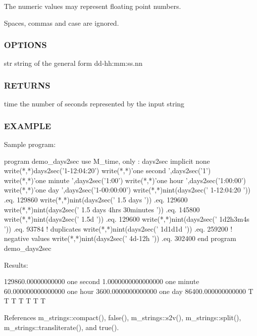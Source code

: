 The numeric values may represent floating point numbers.

Spaces, commas and case are ignored.

\subsubsection*{O\+P\+T\+I\+O\+NS}

str string of the general form dd-\/hh\+:mm\+:ss.\+nn \subsubsection*{R\+E\+T\+U\+R\+NS}

time the number of seconds represented by the input string

\subsubsection*{E\+X\+A\+M\+P\+LE}

\begin{DoxyVerb}Sample program:

 program demo_days2sec
 use M_time, only : days2sec
 implicit none
    write(*,*)days2sec('1-12:04:20')
    write(*,*)'one second ',days2sec('1')
    write(*,*)'one minute ',days2sec('1:00')
    write(*,*)'one hour ',days2sec('1:00:00')
    write(*,*)'one day ',days2sec('1-00:00:00')
    write(*,*)nint(days2sec(' 1-12:04:20              ')) .eq. 129860
    write(*,*)nint(days2sec(' 1.5 days                ')) .eq. 129600
    write(*,*)nint(days2sec(' 1.5 days 4hrs 30minutes ')) .eq. 145800
    write(*,*)nint(days2sec(' 1.5d                    ')) .eq. 129600
    write(*,*)nint(days2sec(' 1d2h3m4s                ')) .eq. 93784
    ! duplicates
    write(*,*)nint(days2sec(' 1d1d1d                  ')) .eq. 259200
    ! negative values
    write(*,*)nint(days2sec(' 4d-12h                  ')) .eq. 302400
 end program demo_days2sec

Results:

 129860.00000000000
 one second    1.0000000000000000
 one minute    60.000000000000000
 one hour    3600.0000000000000
 one day    86400.000000000000
 T
 T
 T
 T
 T
 T
 T \end{DoxyVerb}
 

References m\+\_\+strings\+::compact(), false(), m\+\_\+strings\+::s2v(), m\+\_\+strings\+::split(), m\+\_\+strings\+::transliterate(), and true().

\mbox{\label{namespacem__time_adfda8a89820b8d0ad4581a14896e4ce5}} 

